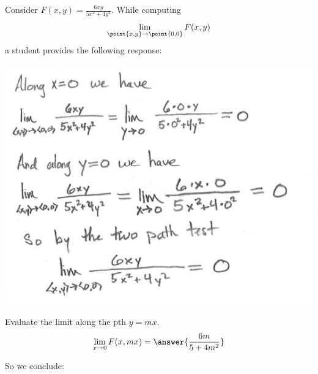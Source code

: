\documentclass{ximera}
\author{Jim Talamo \and Bart Snapp}
\begin{document}
\begin{exercise}
  Consider $F(x,y) = \frac{6xy}{5x^2+4y^2}$. While computing
  \[
  \lim_{\point{x,y}\to \point{0,0}} F(x,y)
  \]
  a student provides the following response:
  \begin{image}
    \includegraphics{studentWork.png}
  \end{image}
  \begin{multipleChoice}
  \end{multipleChoice}
  \begin{exercise}
    Evaluate the limit along the pth $y=mx$.
    \[
    \lim_{x\to 0 }F(x,mx) = \answer{\frac{6 m}{5+4m^2}}
    \]
    \begin{exercise}
      So we conclude:
      \begin{multipleChoice}
      \end{multipleChoice}
    \end{exercise}
  \end{exercise}
\end{exercise}
\end{document}
